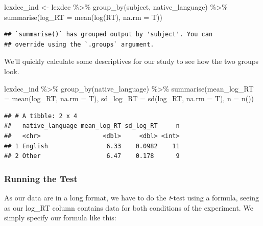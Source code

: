 \documentclass[
]{book}
\newenvironment{Shaded}{\begin{snugshade}}{\end{snugshade}}
\newcommand{\AttributeTok}[1]{\textcolor[rgb]{0.77,0.63,0.00}{#1}}
\newcommand{\FunctionTok}[1]{\textcolor[rgb]{0.00,0.00,0.00}{#1}}
\newcommand{\NormalTok}[1]{#1}
\newcommand{\OtherTok}[1]{\textcolor[rgb]{0.56,0.35,0.01}{#1}}
\newcommand{\SpecialCharTok}[1]{\textcolor[rgb]{0.00,0.00,0.00}{#1}}
\begin{document}
\begin{Shaded}
\begin{Highlighting}[]
\NormalTok{lexdec\_ind }\OtherTok{\textless{}{-}}\NormalTok{ lexdec }\SpecialCharTok{\%\textgreater{}\%} 
  \FunctionTok{group\_by}\NormalTok{(subject, native\_language) }\SpecialCharTok{\%\textgreater{}\%}
  \FunctionTok{summarise}\NormalTok{(}\AttributeTok{log\_RT =} \FunctionTok{mean}\NormalTok{(}\FunctionTok{log}\NormalTok{(RT), }\AttributeTok{na.rm =}\NormalTok{ T))}
\end{Highlighting}
\end{Shaded}

\begin{verbatim}
## `summarise()` has grouped output by 'subject'. You can
## override using the `.groups` argument.
\end{verbatim}

We'll quickly calculate some descriptives for our study to see how the two groups look.

\begin{Shaded}
\begin{Highlighting}[]
\NormalTok{lexdec\_ind }\SpecialCharTok{\%\textgreater{}\%} 
  \FunctionTok{group\_by}\NormalTok{(native\_language) }\SpecialCharTok{\%\textgreater{}\%}
  \FunctionTok{summarise}\NormalTok{(}\AttributeTok{mean\_log\_RT =} \FunctionTok{mean}\NormalTok{(log\_RT, }\AttributeTok{na.rm =}\NormalTok{ T),}
            \AttributeTok{sd\_log\_RT =} \FunctionTok{sd}\NormalTok{(log\_RT, }\AttributeTok{na.rm =}\NormalTok{ T),}
            \AttributeTok{n =} \FunctionTok{n}\NormalTok{())}
\end{Highlighting}
\end{Shaded}

\begin{verbatim}
## # A tibble: 2 x 4
##   native_language mean_log_RT sd_log_RT     n
##   <chr>                 <dbl>     <dbl> <int>
## 1 English                6.33    0.0982    11
## 2 Other                  6.47    0.178      9
\end{verbatim}

\hypertarget{running-the-test-1}{%
\subsubsection{Running the Test}\label{running-the-test-1}}

As our data are in a long format, we have to do the \emph{t}-test using a formula, seeing as our log\_RT column contains data for both conditions of the experiment. We simply specify our formula like this:
\end{document}
